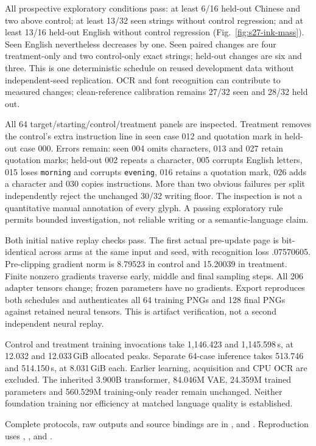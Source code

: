 \documentclass[10pt,a4paper]{article}
\begin{document}
All prospective exploratory conditions pass: at least 6/16 held-out Chinese
and two above control; at least 13/32 seen strings without control regression;
and at least 13/16 held-out English without control regression
(Fig.~\ref{fig:s27-ink-mass}). Seen English nevertheless decreases by one.
Seen paired changes are four treatment-only and two control-only exact strings;
held-out changes are six and three. This is one deterministic schedule on
reused development data without independent-seed replication. OCR and font
recognition can contribute to measured changes; clean-reference calibration
remains 27/32 seen and 28/32 held out.

All 64 target/starting/control/treatment panels are inspected. Treatment removes
the control's extra instruction line in seen case 012 and quotation mark in
held-out case 000. Errors remain: seen 004 omits characters, 013 and 027 retain
quotation marks; held-out 002 repeats a character, 005 corrupts English letters,
015 loses \texttt{morning} and corrupts \texttt{evening}, 016 retains a quotation
mark, 026 adds a character and 030 copies instructions. More than two obvious
failures per split independently reject the unchanged 30/32 writing floor.
The inspection is not a quantitative manual annotation of every glyph. A
passing exploratory rule permits bounded investigation, not reliable writing
or a semantic-language claim.

Both initial native replay checks pass. The first actual pre-update page is
bit-identical across arms at the same input and seed, with recognition loss
.07570605. Pre-clipping gradient norm is 8.79523 in control and 15.20039 in
treatment. Finite nonzero gradients traverse early, middle and final sampling
steps. All 206 adapter tensors change; frozen parameters have no gradients.
Export reproduces both schedules and authenticates all 64 training PNGs and
128 final PNGs against retained neural tensors. This is artifact verification,
not a second independent neural replay.

Control and treatment training invocations take 1,146.423 and 1,145.598\,s,
at 12.032 and 12.033\,GiB allocated peaks. Separate 64-case inference takes
513.746 and 514.150\,s, at 8.031\,GiB each. Earlier learning, acquisition and
CPU OCR are excluded. The inherited 3.900B transformer, 84.046M VAE, 24.359M
trained parameters and 560.529M training-only reader remain unchanged. Neither
foundation training nor efficiency at matched language quality is established.

{\footnotesize\raggedright
Complete protocols, raw outputs and source bindings are in
,
 and
.
Reproduction uses ,
,
 and
.\par}
\end{document}
